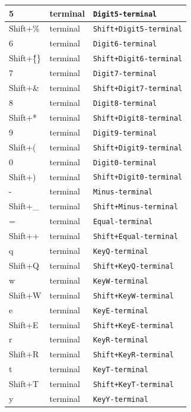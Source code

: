 \documentclass[11pt, a4paper]{article}
\begin{document}
\begin{appendices}
\begin{longtable}{|p{}|p{}|p{}|}
    5 & terminal & \texttt{Digit5-terminal} \\ \hline
    Shift+\% & terminal & \texttt{Shift+Digit5-terminal} \\ \hline
    6 & terminal & \texttt{Digit6-terminal} \\ \hline
    Shift+\^\{\} & terminal & \texttt{Shift+Digit6-terminal} \\ \hline
    7 & terminal & \texttt{Digit7-terminal} \\ \hline
    Shift+\& & terminal & \texttt{Shift+Digit7-terminal} \\ \hline
    8 & terminal & \texttt{Digit8-terminal} \\ \hline
    Shift+* & terminal & \texttt{Shift+Digit8-terminal} \\ \hline
    9 & terminal & \texttt{Digit9-terminal} \\ \hline
    Shift+( & terminal & \texttt{Shift+Digit9-terminal} \\ \hline
    0 & terminal & \texttt{Digit0-terminal} \\ \hline
    Shift+) & terminal & \texttt{Shift+Digit0-terminal} \\ \hline
    - & terminal & \texttt{Minus-terminal} \\ \hline
    Shift+\_ & terminal & \texttt{Shift+Minus-terminal} \\ \hline
    = & terminal & \texttt{Equal-terminal} \\ \hline
    Shift++ & terminal & \texttt{Shift+Equal-terminal} \\ \hline
    q & terminal & \texttt{KeyQ-terminal} \\ \hline
    Shift+Q & terminal & \texttt{Shift+KeyQ-terminal} \\ \hline
    w & terminal & \texttt{KeyW-terminal} \\ \hline
    Shift+W & terminal & \texttt{Shift+KeyW-terminal} \\ \hline
    e & terminal & \texttt{KeyE-terminal} \\ \hline
    Shift+E & terminal & \texttt{Shift+KeyE-terminal} \\ \hline
    r & terminal & \texttt{KeyR-terminal} \\ \hline
    Shift+R & terminal & \texttt{Shift+KeyR-terminal} \\ \hline
    t & terminal & \texttt{KeyT-terminal} \\ \hline
    Shift+T & terminal & \texttt{Shift+KeyT-terminal} \\ \hline
    y & terminal & \texttt{KeyY-terminal} \\ \hline

\end{longtable}
\end{appendices}
\end{document}
